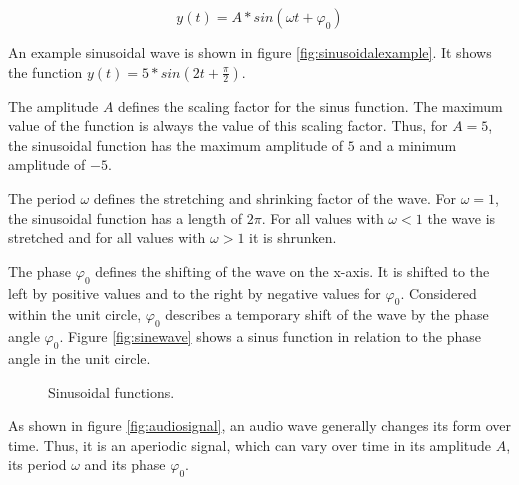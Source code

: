 \begin{equation}
	y(t)=A*sin(\omega t+\varphi_0)
\end{equation}

An example sinusoidal wave is shown in figure \ref{fig:sinusoidalexample}. It shows the function
$y(t)=5*sin(2t+\frac{\pi}{2})$.

The amplitude $A$ defines the scaling factor for the sinus function. The maximum value of the function is always the value of this scaling factor. Thus, for $A=5$, the sinusoidal function has the maximum amplitude of $5$ and a minimum amplitude of $-5$.

The period $\omega$ defines the stretching and shrinking factor of the wave. For $\omega =1$, the sinusoidal function has a length of $2\pi$. For all values with $\omega <1$ the wave is stretched and for all values with $\omega >1$ it is shrunken.

The phase $\varphi_0$ defines the shifting of the wave on the x-axis. It is shifted to the left by positive values and to the right by negative values for $\varphi_0$. Considered within the unit circle, $\varphi_0$ describes a temporary shift of the wave by the phase angle $\varphi_0$. Figure \ref{fig:sinewave} shows a sinus function in relation to the phase angle in the unit circle.

\begin{figure}[ht]
	\centering
	\caption{
		Sinusoidal functions.
	}
\end{figure}

As shown in figure \ref{fig:audiosignal}, an audio wave generally changes its form over time. Thus, it is an aperiodic signal, which can vary over time in its amplitude $A$, its period $\omega$ and its phase $\varphi_0$.

